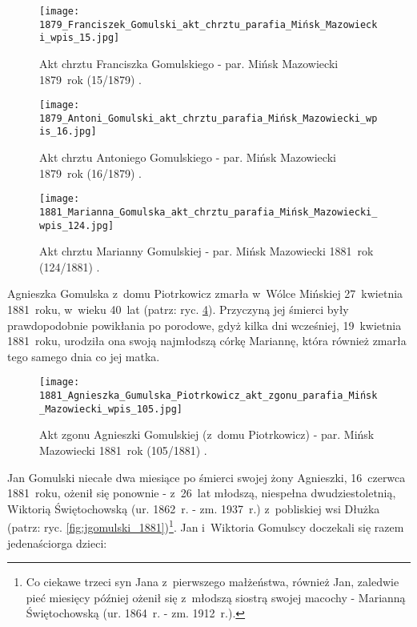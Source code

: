\begin{figure}[!ht]
    \vspace*{0.5cm}
    \centering \texttt{[image: 
        1879\_Franciszek\_Gomulski\_akt\_chrztu\_parafia\_Mińsk\_Mazowiecki\_wpis\_15.jpg]}
    \captionsetup{format=hang}
    \caption{Akt chrztu Franciszka Gomulskiego - par. Mińsk Mazowiecki
    1879~rok (15/1879) 
    \cite{par_minsk2}.}
    \label{fig:fgomulski_1879}
\end{figure}

\begin{figure}[!ht]
    \vspace*{0.5cm}
    \centering \texttt{[image: 
        1879\_Antoni\_Gomulski\_akt\_chrztu\_parafia\_Mińsk\_Mazowiecki\_wpis\_16.jpg]}
    \captionsetup{format=hang}
    \caption{Akt chrztu Antoniego Gomulskiego - par. Mińsk Mazowiecki
    1879~rok (16/1879) 
    \cite{par_minsk2}.}
    \label{fig:agomulski_1879}
\end{figure}

\begin{figure}[!ht]
    \vspace*{0.5cm}
    \centering \texttt{[image: 
        1881\_Marianna\_Gomulska\_akt\_chrztu\_parafia\_Mińsk\_Mazowiecki\_wpis\_124.jpg]}
    \captionsetup{format=hang}
    \caption{Akt chrztu Marianny Gomulskiej - par. Mińsk Mazowiecki
    1881~rok (124/1881) 
    \cite{par_minsk2}.}
    \label{fig:mgomulska_1881}
\end{figure}

Agnieszka Gomulska z~domu Piotrkowicz zmarła w~Wólce Mińskiej 27~kwietnia
1881~roku, w~wieku 40~lat (patrz: ryc. \ref{fig:agomulska_1881}). Przyczyną
jej śmierci były prawdopodobnie powikłania po porodowe, gdyż kilka dni
wcześniej, 19~kwietnia 1881~roku, urodziła ona swoją najmłodszą córkę Mariannę,
która również zmarła tego samego dnia co jej matka.

\begin{figure}[!ht]
    \vspace*{0.5cm}
    \centering \texttt{[image: 
        1881\_Agnieszka\_Gumulska\_Piotrkowicz\_akt\_zgonu\_parafia\_Mińsk\_Mazowiecki\_wpis\_105.jpg]}
    \captionsetup{format=hang}
    \caption{Akt zgonu Agnieszki Gomulskiej (z~domu Piotrkowicz) - par. Mińsk
    Mazowiecki 1881~rok (105/1881) 
    \cite{par_minsk2}.}
    \label{fig:agomulska_1881}
\end{figure}

Jan Gomulski niecałe dwa miesiące po śmierci swojej żony Agnieszki, 16~czerwca
1881~roku, ożenił się ponownie - z~26~lat młodszą, niespełna dwudziestoletnią,
Wiktorią Świętochowską (ur. 1862~r. - zm. 1937~r.) z~pobliskiej wsi
Dłużka (patrz: ryc. \ref{fig:jgomulski_1881})\footnote{Co ciekawe trzeci syn
Jana z~pierwszego małżeństwa, również Jan, zaledwie pieć miesięcy później
ożenił się z~młodszą siostrą swojej macochy - Marianną Świętochowską (ur.
1864~r. - zm. 1912~r.).}. Jan i~Wiktoria Gomulscy doczekali się razem
jedenaściorga dzieci:

